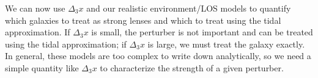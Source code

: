 We can now use $\Delta_3 x$ and our realistic environment/LOS models to quantify which galaxies to treat as strong lenses and which to treat using the tidal approximation. If $\Delta_3x$ is small, the perturber is not important and can be treated using the tidal approximation; if $\Delta_3 x$ is large, we must treat the galaxy exactly. In general, these models are too complex to write down analytically, so we need a simple quantity like $\Delta_3 x$ to characterize the strength of a given perturber. 
  